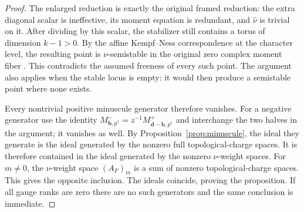 \begin{proof}
The enlarged reduction is exactly the original framed reduction:
the extra diagonal scalar is ineffective, its moment equation is
redundant, and \(\widehat\nu\) is trivial on it.
After dividing by this scalar, the stabilizer still contains a torus
of dimension \(k-1>0\).
By the affine Kempf--Ness correspondence at the character level, the
resulting point is \(\nu\)-semistable in the original zero complex
moment fiber \cite[Theorem~6.1 and Corollary~6.2]{King94}.
This contradicts the assumed freeness of every such point.
The argument also applies when the stable locus is empty: it would
then produce a semistable point where none exists.

Every nontrivial positive minuscule generator therefore vanishes.
For a negative generator use the identity
\(M_{\mathbf b,p^{\uparrow}}^{-}
  =z^{-1}M_{\mathbf d-\mathbf b,p^{\uparrow}}^{+}\)
and interchange the two halves in the argument; it vanishes as well.
By Proposition~\ref{prop:minuscule}, the ideal they generate is the ideal
generated by the nonzero full topological-charge spaces.  It is therefore
contained in the ideal generated by the nonzero \(\nu\)-weight spaces.
For \(m\ne0\), the \(\nu\)-weight space \((A_F)_m\) is a sum of nonzero
topological-charge spaces.  This gives the opposite inclusion.
The ideals coincide, proving the proposition.
If all gauge ranks are zero there are no such generators and the
same conclusion is immediate.
\end{proof}
